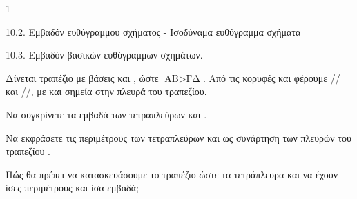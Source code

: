 \begin{ylh}{1}
    \item 10.2. Εμβαδόν ευθύγραμμου σχήματος - Ισοδύναμα ευθύγραμμα σχήματα
    \item 10.3. Εμβαδόν βασικών ευθύγραμμων σχημάτων.
\end{ylh}
Δίνεται τραπέζιο  με βάσεις  και , ώστε $\text{ΑΒ} > \text{ΓΔ}$. Από τις κορυφές  και  φέρουμε // και //, με  και  σημεία στην πλευρά  του τραπεζίου.
\begin{alist}
\item Να συγκρίνετε τα εμβαδά των τετραπλεύρων  και .  
\item Να εκφράσετε τις περιμέτρους των τετραπλεύρων  και  ως συνάρτηση των πλευρών του τραπεζίου .  
\item Πώς θα πρέπει να κατασκευάσουμε το τραπέζιο  ώστε τα τετράπλευρα  και  να έχουν ίσες περιμέτρους και ίσα εμβαδά;  
\end{alist}